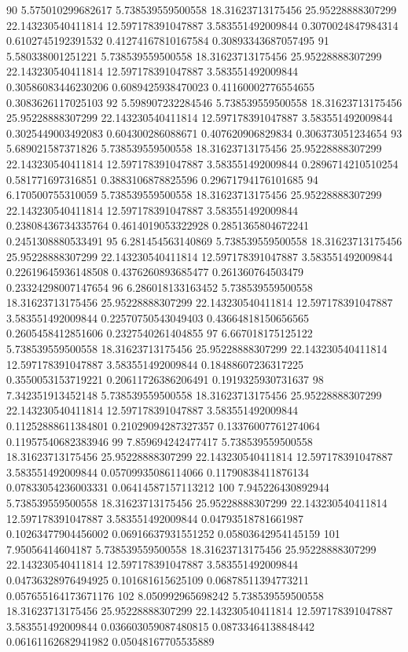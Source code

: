 {90 5.575010299682617 5.738539559500558 18.31623713175456 25.95228888307299 22.143230540411814 12.597178391047887 3.583551492009844 0.3070024847984314 0.6102745192391532 0.41274167810167584 0.30893343687057495
91 5.580338001251221 5.738539559500558 18.31623713175456 25.95228888307299 22.143230540411814 12.597178391047887 3.583551492009844 0.30586083446230206 0.6089425938470023 0.41160002776554655 0.3083626117025103
92 5.598907232284546 5.738539559500558 18.31623713175456 25.95228888307299 22.143230540411814 12.597178391047887 3.583551492009844 0.3025449003492083 0.604300286088671 0.407620906829834 0.306373051234654
93 5.689021587371826 5.738539559500558 18.31623713175456 25.95228888307299 22.143230540411814 12.597178391047887 3.583551492009844 0.2896714210510254 0.581771697316851 0.3883106878825596 0.29671794176101685
94 6.170500755310059 5.738539559500558 18.31623713175456 25.95228888307299 22.143230540411814 12.597178391047887 3.583551492009844 0.23808436734335764 0.4614019053322928 0.2851365804672241 0.2451308880533491
95 6.281454563140869 5.738539559500558 18.31623713175456 25.95228888307299 22.143230540411814 12.597178391047887 3.583551492009844 0.22619645936148508 0.4376260893685477 0.261360764503479 0.23324298007147654
96 6.286018133163452 5.738539559500558 18.31623713175456 25.95228888307299 22.143230540411814 12.597178391047887 3.583551492009844 0.22570750543049403 0.43664818150656565 0.2605458412851606 0.2327540261404855
97 6.667018175125122 5.738539559500558 18.31623713175456 25.95228888307299 22.143230540411814 12.597178391047887 3.583551492009844 0.18488607236317225 0.3550053153719221 0.20611726386206491 0.1919325930731637
98 7.342351913452148 5.738539559500558 18.31623713175456 25.95228888307299 22.143230540411814 12.597178391047887 3.583551492009844 0.11252888611384801 0.21029094287327357 0.13376007761274064 0.11957540682383946
99 7.859694242477417 5.738539559500558 18.31623713175456 25.95228888307299 22.143230540411814 12.597178391047887 3.583551492009844 0.05709935086114066 0.11790838411876134 0.07833054236003331 0.06414587157113212
100 7.945226430892944 5.738539559500558 18.31623713175456 25.95228888307299 22.143230540411814 12.597178391047887 3.583551492009844 0.04793518781661987 0.10263477904456002 0.06916637931551252 0.05803642954145159
101 7.95056414604187 5.738539559500558 18.31623713175456 25.95228888307299 22.143230540411814 12.597178391047887 3.583551492009844 0.04736328976494925 0.101681615625109 0.06878511394773211 0.057655164173671176
102 8.050992965698242 5.738539559500558 18.31623713175456 25.95228888307299 22.143230540411814 12.597178391047887 3.583551492009844 0.036603059087480815 0.08733464138848442 0.06161162682941982 0.05048167705535889
}
